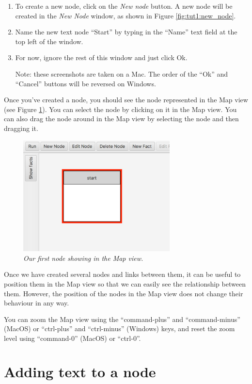 \documentclass{article}
\begin{document}
\begin{enumerate}
  \item To create a new node, click on the \textit{New node} button. A new node will be created in the \textit{New Node} window, as shown in Figure \ref{fig:tut1:new_node}.
  \item Name the new text node ``Start'' by typing in the ``Name'' text field at the top left of the window. 
  \item For now, ignore the rest of this window and just click Ok.
  
  Note: these screenshots are taken on a Mac. The order of the ``Ok'' and ``Cancel'' buttons will be reversed on Windows.
\end{enumerate}
 
Once you've created a node, you should see the node represented in the Map view (see Figure \ref{fig:tut1:first_node}). You can select the
node by clicking on it in the Map view. You can also drag the node around in the Map view by selecting the node and then dragging it. 

\begin{figure}[ht]
  \centering \includegraphics[width=8cm]{images/hypedyn-tutorial-1-figure-4}
  \caption{\textit{Our first node showing in the Map view.}}
  \label{fig:tut1:first_node}
\end{figure} 

Once we have created several nodes and links between them, it can be useful to position them in the Map view so that we can easily see the relationship between them. However, the position of the nodes in the Map view does not change their behaviour in any way. 

You can zoom the Map view using the ``command-plus'' and ``command-minus'' (MacOS) or ``ctrl-plus'' and ``ctrl-minus'' (Windows) keys, and reset the zoom level using ``command-0'' (MacOS) or ``ctrl-0''.

\section{Adding text to a node}
\end{document}
